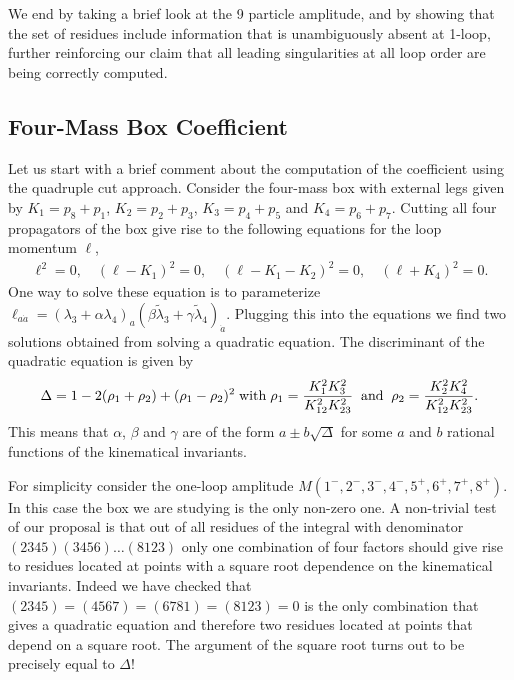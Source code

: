 \documentclass[12pt]{article}
\newcommand{\be}{\begin{eqnarray}}
\newcommand{\ee}{\end{eqnarray}}
\begin{document}
We end by taking a brief look at the 9 particle amplitude, and
by showing that the set of residues include information that is
unambiguously absent at 1-loop, further reinforcing our claim that
all leading singularities at all loop order are being correctly
computed.

\subsection{Four-Mass Box Coefficient}
\label{subsec:4m}

Let us start with a brief comment about the computation of the coefficient using the quadruple cut approach. Consider the four-mass box with external legs given by $K_1 = p_8+p_1$, $K_2 = p_2+p_3$, $K_3=p_4+p_5$ and $K_4=p_6+p_7$. Cutting all four propagators of the box give rise to the following equations for the loop momentum $\ell$,
%
\be
\ell^2=0, \quad (\ell-K_1)^2=0, \quad (\ell-K_1-K_2)^2=0, \quad (\ell+K_4)^2 = 0.
\ee
%
One way to solve these equation is to parameterize $\ell_{a\dot a} = (\lambda_3+\alpha\lambda_4)_a(\beta\tilde\lambda_3+\gamma\tilde\lambda_4)_{\dot a}$. Plugging this into the equations we find two solutions obtained from solving a quadratic equation. The discriminant of the quadratic equation is given by
\be
\Delta = 1-2(\rho_1+\rho_2)+(\rho_1-\rho_2)^2\; {\rm with}\; \rho_1 = \frac{K_1^2K_3^2}{K_{12}^2K_{23}^2}\;\; {\rm and} \;\; \rho_2 = \frac{K_2^2K_4^2}{K_{12}^2K_{23}^2}.
\ee
This means that $\alpha$, $\beta$ and $\gamma$ are of the form $a\pm b\sqrt{\Delta}$ for some $a$ and $b$ rational functions of the kinematical invariants.

For simplicity consider the one-loop amplitude
$M(1^-,2^-,3^-,4^-,5^+,6^+,7^+,8^+)$. In this case the box we are
studying is the only non-zero one. A non-trivial test of our
proposal is that out of all residues of the integral with
denominator $(2345)(3456)\ldots (8123)$ only one combination of four
factors should give rise to residues located at points with a square
root dependence on the kinematical invariants. Indeed we have
checked that $(2345)=(4567)=(6781)=(8123)=0$ is the only combination
that gives a quadratic equation and therefore two residues located
at points that depend on a square root. The argument of the square
root turns out to be precisely equal to $\Delta$!
\end{document}
